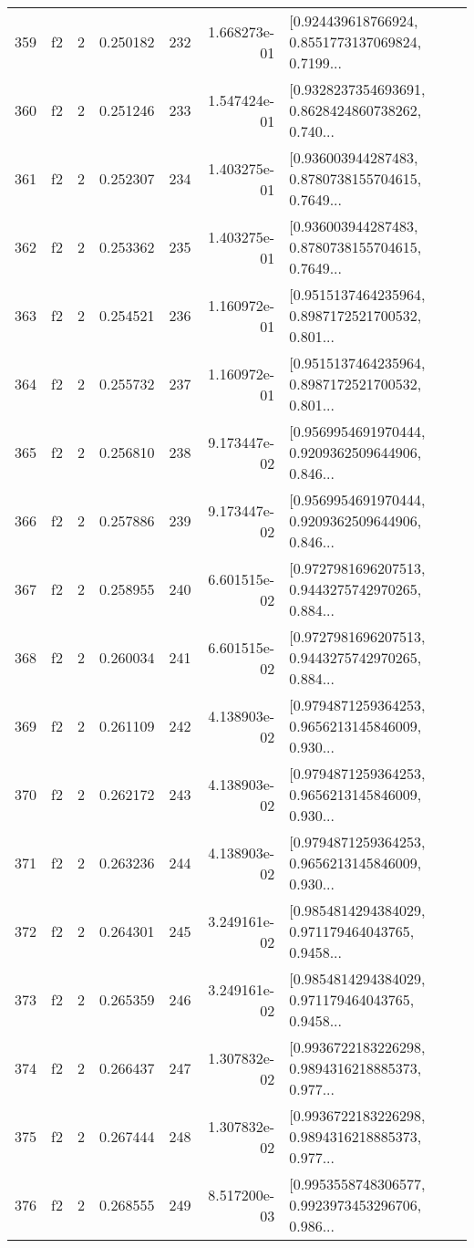 \begin{tabular}{lllrlrl}
359 &  f2 &   2 &  0.250182 &  232 &  1.668273e-01 &  [0.924439618766924, 0.8551773137069824, 0.7199... \\
360 &  f2 &   2 &  0.251246 &  233 &  1.547424e-01 &  [0.9328237354693691, 0.8628424860738262, 0.740... \\
361 &  f2 &   2 &  0.252307 &  234 &  1.403275e-01 &  [0.936003944287483, 0.8780738155704615, 0.7649... \\
362 &  f2 &   2 &  0.253362 &  235 &  1.403275e-01 &  [0.936003944287483, 0.8780738155704615, 0.7649... \\
363 &  f2 &   2 &  0.254521 &  236 &  1.160972e-01 &  [0.9515137464235964, 0.8987172521700532, 0.801... \\
364 &  f2 &   2 &  0.255732 &  237 &  1.160972e-01 &  [0.9515137464235964, 0.8987172521700532, 0.801... \\
365 &  f2 &   2 &  0.256810 &  238 &  9.173447e-02 &  [0.9569954691970444, 0.9209362509644906, 0.846... \\
366 &  f2 &   2 &  0.257886 &  239 &  9.173447e-02 &  [0.9569954691970444, 0.9209362509644906, 0.846... \\
367 &  f2 &   2 &  0.258955 &  240 &  6.601515e-02 &  [0.9727981696207513, 0.9443275742970265, 0.884... \\
368 &  f2 &   2 &  0.260034 &  241 &  6.601515e-02 &  [0.9727981696207513, 0.9443275742970265, 0.884... \\
369 &  f2 &   2 &  0.261109 &  242 &  4.138903e-02 &  [0.9794871259364253, 0.9656213145846009, 0.930... \\
370 &  f2 &   2 &  0.262172 &  243 &  4.138903e-02 &  [0.9794871259364253, 0.9656213145846009, 0.930... \\
371 &  f2 &   2 &  0.263236 &  244 &  4.138903e-02 &  [0.9794871259364253, 0.9656213145846009, 0.930... \\
372 &  f2 &   2 &  0.264301 &  245 &  3.249161e-02 &  [0.9854814294384029, 0.971179464043765, 0.9458... \\
373 &  f2 &   2 &  0.265359 &  246 &  3.249161e-02 &  [0.9854814294384029, 0.971179464043765, 0.9458... \\
374 &  f2 &   2 &  0.266437 &  247 &  1.307832e-02 &  [0.9936722183226298, 0.9894316218885373, 0.977... \\
375 &  f2 &   2 &  0.267444 &  248 &  1.307832e-02 &  [0.9936722183226298, 0.9894316218885373, 0.977... \\
376 &  f2 &   2 &  0.268555 &  249 &  8.517200e-03 &  [0.9953558748306577, 0.9923973453296706, 0.986... \\

\end{tabular}
